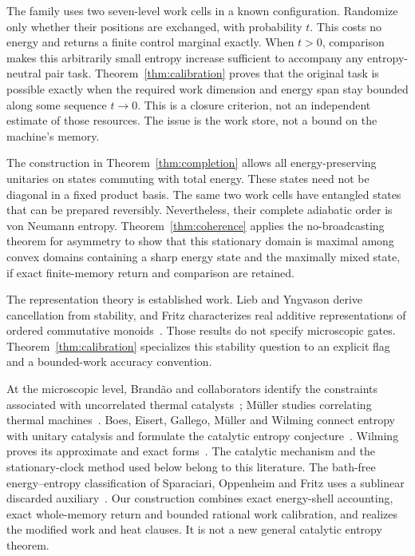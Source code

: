 \documentclass[11pt,a4paper]{article}
\begin{document}
The family uses two seven-level work cells in a known configuration. Randomize only whether their positions are exchanged, with probability $t$. This costs no energy and returns a finite control marginal exactly. When $t>0$, comparison makes this arbitrarily small entropy increase sufficient to accompany any entropy-neutral pair task. Theorem~\ref{thm:calibration} proves that the original task is possible exactly when the required work dimension and energy span stay bounded along some sequence $t\to0$. This is a closure criterion, not an independent estimate of those resources. The issue is the work store, not a bound on the machine's memory.

The construction in Theorem~\ref{thm:completion} allows all energy-preserving unitaries on states commuting with total energy. These states need not be diagonal in a fixed product basis. The same two work cells have entangled states that can be prepared reversibly. Nevertheless, their complete adiabatic order is von Neumann entropy. Theorem~\ref{thm:coherence} applies the no-broadcasting theorem for asymmetry to show that this stationary domain is maximal among convex domains containing a sharp energy state and the maximally mixed state, if exact finite-memory return and comparison are retained.

The representation theory is established work. Lieb and Yngvason derive cancellation from stability, and Fritz characterizes real additive representations of ordered commutative monoids~\cite[Sec.~II.C]{lieb}\cite[Theorem~9.4]{fritz}. Those results do not specify microscopic gates. Theorem~\ref{thm:calibration} specializes this stability question to an explicit flag and a bounded-work accuracy convention.

At the microscopic level, Brand\~ao and collaborators identify the constraints associated with uncorrelated thermal catalysts~\cite{brandao}; M\"uller studies correlating thermal machines~\cite{muller}. Boes, Eisert, Gallego, M\"uller and Wilming connect entropy with unitary catalysis and formulate the catalytic entropy conjecture~\cite{boes}. Wilming proves its approximate and exact forms~\cite{wilming21,wilming22}. The catalytic mechanism and the stationary-clock method used below belong to this literature. The bath-free energy--entropy classification of Sparaciari, Oppenheim and Fritz uses a sublinear discarded auxiliary~\cite{sparaciari}. Our construction combines exact energy-shell accounting, exact whole-memory return and bounded rational work calibration, and realizes the modified work and heat clauses. It is not a new general catalytic entropy theorem.
\end{document}
